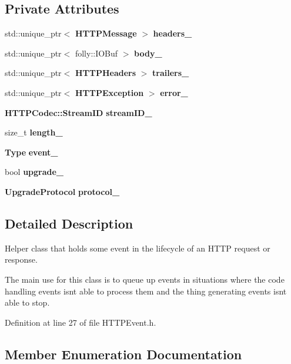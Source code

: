 \subsection*{Private Attributes}
\begin{DoxyCompactItemize}
\item 
std\+::unique\+\_\+ptr$<$ {\bf H\+T\+T\+P\+Message} $>$ {\bf headers\+\_\+}
\item 
std\+::unique\+\_\+ptr$<$ folly\+::\+I\+O\+Buf $>$ {\bf body\+\_\+}
\item 
std\+::unique\+\_\+ptr$<$ {\bf H\+T\+T\+P\+Headers} $>$ {\bf trailers\+\_\+}
\item 
std\+::unique\+\_\+ptr$<$ {\bf H\+T\+T\+P\+Exception} $>$ {\bf error\+\_\+}
\item 
{\bf H\+T\+T\+P\+Codec\+::\+Stream\+ID} {\bf stream\+I\+D\+\_\+}
\item 
size\+\_\+t {\bf length\+\_\+}
\item 
{\bf Type} {\bf event\+\_\+}
\item 
bool {\bf upgrade\+\_\+}
\item 
{\bf Upgrade\+Protocol} {\bf protocol\+\_\+}
\end{DoxyCompactItemize}


\subsection{Detailed Description}
Helper class that holds some event in the lifecycle of an H\+T\+TP request or response.

The main use for this class is to queue up events in situations where the code handling events isn\textquotesingle{}t able to process them and the thing generating events isn\textquotesingle{}t able to stop. 

Definition at line 27 of file H\+T\+T\+P\+Event.\+h.



\subsection{Member Enumeration Documentation}
